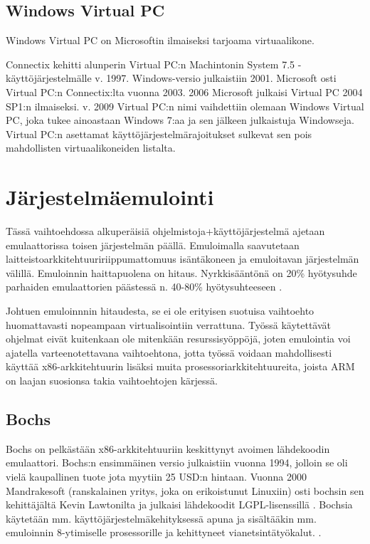 \subsection{Windows Virtual PC}
Windows Virtual PC on Microsoftin ilmaiseksi tarjoama virtuaalikone.

Connectix kehitti alunperin Virtual PC:n Machintonin System 7.5 -käyttöjärjestelmälle v. 1997. Windows-versio julkaistiin 2001. Microsoft osti Virtual PC:n Connectix:lta vuonna 2003. 2006 Microsoft julkaisi Virtual PC 2004 SP1:n ilmaiseksi. v. 2009 Virtual PC:n nimi vaihdettiin olemaan Windows Virtual PC, joka tukee ainoastaan Windows 7:aa ja sen jälkeen julkaistuja Windowseja. Virtual PC:n asettamat käyttöjärjestelmärajoitukset sulkevat sen pois mahdollisten virtuaalikoneiden listalta.


\section{Järjestelmäemulointi}

Tässä vaihtoehdossa alkuperäisiä ohjelmistoja+käyttöjärjestelmä ajetaan emulaattorissa toisen järjestelmän päällä. Emuloimalla saavutetaan laitteistoarkkitehtuuririippumattomuus isäntäkoneen ja emuloitavan järjestelmän välillä. Emuloinnin haittapuolena on hitaus. Nyrkkisääntönä on 20\% hyötysuhde \cite{tinycc} parhaiden emulaattorien päästessä n. 40-80\% hyötysuhteeseen \cite{40pperf}.

Johtuen emuloinnnin hitaudesta, se ei ole erityisen suotuisa vaihtoehto huomattavasti nopeampaan virtualisointiin verrattuna. Työssä käytettävät ohjelmat eivät kuitenkaan ole mitenkään resurssisyöppöjä, joten emulointia voi ajatella varteenotettavana vaihtoehtona, jotta työssä voidaan mahdollisesti käyttää x86-arkkitehtuurin lisäksi muita prosessoriarkkitehtuureita, joista ARM on laajan suosionsa takia vaihtoehtojen kärjessä.


\subsection{Bochs}

Bochs on pelkästään x86-arkkitehtuuriin keskittynyt avoimen lähdekoodin emulaattori. Bochs:n ensimmäinen versio julkaistiin vuonna 1994, jolloin se oli vielä kaupallinen tuote jota myytiin 25 USD:n hintaan. Vuonna 2000 Mandrakesoft (ranskalainen yritys, joka on erikoistunut Linuxiin) osti bochsin sen kehittäjältä Kevin Lawtonilta ja julkaisi lähdekoodit LGPL-lisenssillä \cite{bochs0}. Bochsia käytetään mm. käyttöjärjestelmäkehityksessä apuna ja sisältääkin mm. emuloinnin 8-ytimiselle prosessorille ja kehittyneet vianetsintätyökalut. \cite{bochs_doc}.


